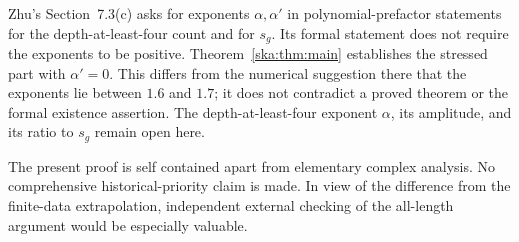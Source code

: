 \documentclass[11pt,letterpaper]{article}
\theoremstyle{definition}
\begin{document}
Zhu's Section~7.3(c) asks for exponents $\alpha,\alpha'$ in polynomial-prefactor statements for the depth-at-least-four count and for $s_g$. Its formal statement does not require the exponents to be positive. Theorem~\ref{ska:thm:main} establishes the stressed part with $\alpha'=0$. This differs from the numerical suggestion there that the exponents lie between $1.6$ and $1.7$; it does not contradict a proved theorem or the formal existence assertion. The depth-at-least-four exponent $\alpha$, its amplitude, and its ratio to $s_g$ remain open here.

The present proof is self contained apart from elementary complex analysis. No comprehensive historical-priority claim is made. In view of the difference from the finite-data extrapolation, independent external checking of the all-length argument would be especially valuable.
\end{document}
